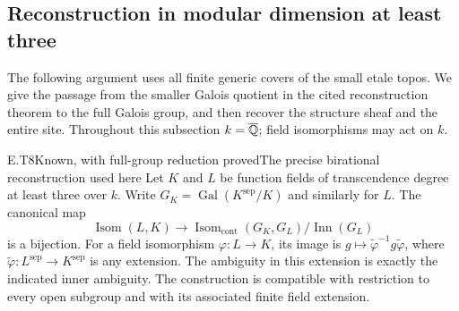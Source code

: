\subsection{Reconstruction in modular dimension at least three}

The following argument uses all finite generic covers of the small
etale topos.  We give the passage from the smaller Galois quotient
in the cited reconstruction theorem to the full Galois group, and
then recover the structure sheaf and the entire site.  Throughout
this subsection $k=\overline{\mathbb Q}$; field isomorphisms may act on $k$.

\begin{result}{E.T8}{Known, with full-group reduction proved}{The precise birational reconstruction used here}
Let $K$ and $L$ be function fields of transcendence degree at least
three over $k$.  Write $G_K=\operatorname{Gal}(K^{\mathrm{sep}}/K)$
and similarly for $L$.  The canonical map
\[
 \operatorname{Isom}(L,K)\longrightarrow
 \operatorname{Isom}_{\mathrm{cont}}(G_K,G_L)/\operatorname{Inn}(G_L)
                                                               \tag{E.T33}
\]
is a bijection.  For a field isomorphism $\varphi:L\to K$, its image
is $g\mapsto\widetilde\varphi^{-1}g\widetilde\varphi$, where
$\widetilde\varphi:L^{\mathrm{sep}}\to K^{\mathrm{sep}}$ is any
extension.  The ambiguity in this extension is exactly the indicated
inner ambiguity.  The construction is compatible with restriction
to every open subgroup and with its associated finite field extension.
\end{result}
